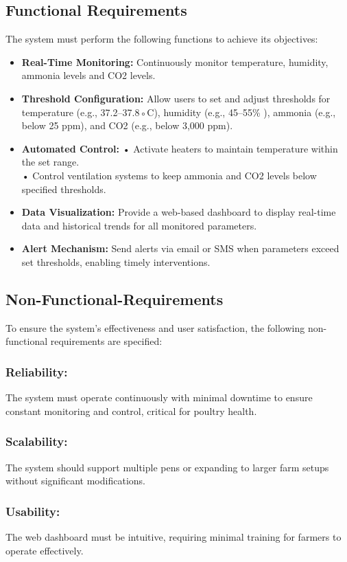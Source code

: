 \documentclass[../main.tex]{subfiles}
\begin{document}
\subsection{Functional Requirements}
  The system must perform the following functions to achieve its objectives:
\begin{itemize}
    \item   \textbf{Real-Time Monitoring:} Continuously monitor temperature, humidity, ammonia levels and CO2 levels.
\item  \textbf{Threshold Configuration:} Allow users to set and adjust thresholds for temperature (e.g.,
 37.2–37.8◦C), humidity (e.g., 45–55\% ), ammonia
 (e.g., below 25 ppm), and CO2 (e.g., below 3,000 ppm).
\item \textbf{ Automated Control:}
 • Activate heaters to maintain temperature within the set range.\\
 • Control ventilation systems to keep ammonia and CO2 levels below specified  thresholds.
\item \textbf{Data Visualization:} Provide a web-based dashboard to display real-time data and historical trends for all monitored parameters.
\item \textbf{Alert Mechanism:} Send alerts via email or SMS when parameters exceed set thresholds, enabling timely interventions.
\end{itemize}

\subsection{Non-Functional-Requirements}
 To ensure the system’s effectiveness and user satisfaction, the following non-functional requirements are specified:
\subsubsection{ Reliability:}
The system must operate continuously with minimal downtime to ensure constant monitoring and control, critical for poultry health.
\subsubsection{Scalability:}
 The system should support multiple pens or expanding to larger farm setups without significant modifications.
\subsubsection{Usability: }
 The web dashboard must be intuitive, requiring minimal training for farmers to operate effectively.
\end{document}
